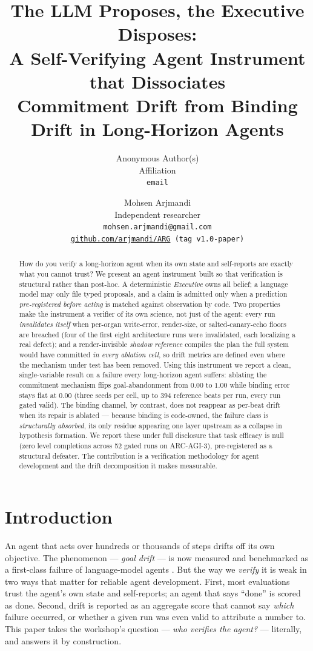 \documentclass{article}
\title{The LLM Proposes, the Executive Disposes:\\
A Self-Verifying Agent Instrument that Dissociates\\
Commitment Drift from Binding Drift in Long-Horizon Agents}
\author{Anonymous Author(s)\\Affiliation\\\texttt{email}}
\author{%
    Mohsen Arjmandi\\
    Independent researcher\\
    \texttt{mohsen.arjmandi@gmail.com}\\
    \texttt{\href{https://github.com/arjmandi/ARG}{github.com/arjmandi/ARG} (tag \texttt{v1.0-paper})}%
  }
\begin{document}
\maketitle

\begin{abstract}
How do you verify a long-horizon agent when its own state and self-reports are
exactly what you cannot trust? We present an agent instrument built so that
verification is structural rather than post-hoc. A deterministic \emph{Executive}
owns all belief; a language model may only file typed proposals, and a claim is
admitted only when a prediction \emph{pre-registered before acting} is matched
against observation by code. Two properties make the instrument a verifier of its
own science, not just of the agent: every run \emph{invalidates itself} when
per-organ write-error, render-size, or salted-canary-echo floors are breached
(four of the first eight architecture runs were invalidated, each localizing a
real defect); and a render-invisible \emph{shadow reference} compiles the plan the
full system would have committed \emph{in every ablation cell}, so drift metrics
are defined even where the mechanism under test has been removed. Using this
instrument we report a clean, single-variable result on a failure every
long-horizon agent suffers: ablating the commitment mechanism flips
goal-abandonment from $0.00$ to $1.00$ while binding error stays flat at $0.00$
(three seeds per cell, up to 394 reference beats per run, every run gated valid).
The binding channel, by contrast, does not reappear as per-beat drift when its
repair is ablated --- because binding is code-owned, the failure class is
\emph{structurally absorbed}, its only residue appearing one layer upstream as a
collapse in hypothesis formation. We report these under full disclosure that task
efficacy is null (zero level completions across 52 gated runs on ARC-AGI-3),
pre-registered as a structural defeater. The contribution is a verification
methodology for agent development and the drift decomposition it makes measurable.
\end{abstract}

\section{Introduction}

An agent that acts over hundreds or thousands of steps drifts off its own
objective. The phenomenon --- \emph{goal drift} --- is now measured and
benchmarked as a first-class failure of language-model agents
\citep{arike2025goaldrift,menon2026inherited}. But the way we \emph{verify} it is
weak in two ways that matter for reliable agent development. First, most
evaluations trust the agent's own state and self-reports; an agent that says
``done'' is scored as done. Second, drift is reported as an aggregate score that
cannot say \emph{which} failure occurred, or whether a given run was even valid to
attribute a number to. This paper takes the workshop's question --- \emph{who
verifies the agent?} --- literally, and answers it by construction.
\end{document}
